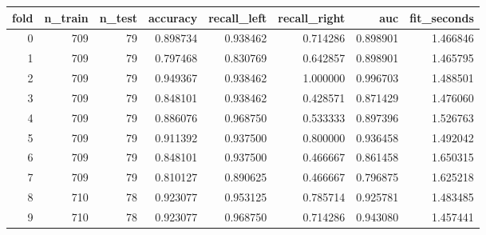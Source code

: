 \begin{tabular}{rrrrrrrr}
\toprule
fold & n_train & n_test & accuracy & recall_left & recall_right & auc & fit_seconds \\
\midrule
0 & 709 & 79 & 0.898734 & 0.938462 & 0.714286 & 0.898901 & 1.466846 \\
1 & 709 & 79 & 0.797468 & 0.830769 & 0.642857 & 0.898901 & 1.465795 \\
2 & 709 & 79 & 0.949367 & 0.938462 & 1.000000 & 0.996703 & 1.488501 \\
3 & 709 & 79 & 0.848101 & 0.938462 & 0.428571 & 0.871429 & 1.476060 \\
4 & 709 & 79 & 0.886076 & 0.968750 & 0.533333 & 0.897396 & 1.526763 \\
5 & 709 & 79 & 0.911392 & 0.937500 & 0.800000 & 0.936458 & 1.492042 \\
6 & 709 & 79 & 0.848101 & 0.937500 & 0.466667 & 0.861458 & 1.650315 \\
7 & 709 & 79 & 0.810127 & 0.890625 & 0.466667 & 0.796875 & 1.625218 \\
8 & 710 & 78 & 0.923077 & 0.953125 & 0.785714 & 0.925781 & 1.483485 \\
9 & 710 & 78 & 0.923077 & 0.968750 & 0.714286 & 0.943080 & 1.457441 \\
\bottomrule
\end{tabular}
